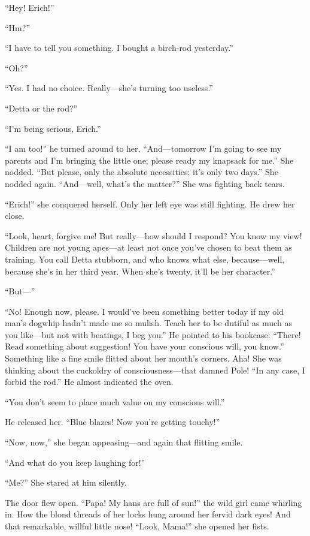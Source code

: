 \documentclass[12pt,a4paper]{article}
\begin{document}
“Hey! Erich!”

“Hm?”

“I have to tell you something. I bought a birch-rod yesterday.”

“Oh?”

“Yes. I had no choice. Really—she’s turning too useless.”

“Detta or the rod?”

“I’m being serious, Erich.”

“I am too!” he turned around to her. “And—tomorrow I’m going to see my parents and I’m bringing the little one; please ready my knapsack for me.” She nodded. “But please, only the absolute necessities; it’s only two days.” She nodded again. “And—well, what’s the matter?” She was fighting back tears.

“Erich!” she conquered herself. Only her left eye was still fighting. He drew her close.

“Look, heart, forgive me! But really—how should I respond? You know my view! Children are not young apes—at least not once you’ve chosen to beat them as training. You call Detta stubborn, and who knows what else, because—well, because she’s in her third year. When she’s twenty, it’ll be her character.”

“But—”

“No! Enough now, please. I would’ve been something better today if my old man’s dogwhip hadn’t made me so mulish. Teach her to be dutiful as much as you like—but not with beatings, I beg you.” He pointed to his bookcase: “There! Read something about suggestion! You have your conscious will, you know.” Something like a fine smile flitted about her mouth’s corners. Aha! She was thinking about the cuckoldry of consciousness—that damned Pole! “In any case, I forbid the rod.” He almost indicated the oven.

“You don’t seem to place much value on my conscious will.”

He released her. “Blue blazes! Now you’re getting touchy!”

“Now, now,” she began appeasing—and again that flitting smile.

“And what do you keep laughing for!”

“Me?” She stared at him silently.

The door flew open. “Papa! My hans are full of sun!” the wild girl came whirling in. How the blond threads of her locks hung around her fervid dark eyes! And that remarkable, willful little nose! “Look, Mama!” she opened her fists.
\end{document}

